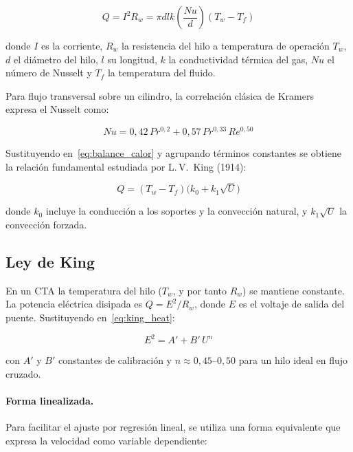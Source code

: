 \documentclass[12pt,a4paper]{article}
\begin{document}
\begin{equation}
	Q = I^2 R_w = \pi d l k \left(\frac{Nu}{d}\right)(T_w - T_f)
	\label{eq:balance_calor}
\end{equation}

donde $I$ es la corriente, $R_w$ la resistencia del hilo a temperatura de
operación $T_w$, $d$ el diámetro del hilo, $l$ su longitud, $k$ la
conductividad térmica del gas, $Nu$ el número de Nusselt y $T_f$ la
temperatura del fluido.

Para flujo transversal sobre un cilindro, la correlación clásica de
Kramers~\cite{bruun1995} expresa el Nusselt como:

\begin{equation}
	Nu = 0{,}42\,Pr^{0{,}2} + 0{,}57\,Pr^{0{,}33}\,Re^{0{,}50}
	\label{eq:kramers}
\end{equation}

Sustituyendo en~\eqref{eq:balance_calor} y agrupando términos constantes
se obtiene la relación fundamental estudiada por L.\,V.~King (1914):

\begin{equation}
	Q = (T_w - T_f)\bigl(k_0 + k_1\sqrt{U}\bigr)
	\label{eq:king_heat}
\end{equation}

donde $k_0$ incluye la conducción a los soportes y la convección natural, y
$k_1\sqrt{U}$ la convección forzada.

\subsection{Ley de King}
\label{subsec:king}

En un CTA la temperatura del hilo ($T_w$, y por tanto $R_w$) se mantiene
constante.  La potencia eléctrica disipada es $Q = E^2/R_w$, donde $E$ es
el voltaje de salida del puente.  Sustituyendo en~\eqref{eq:king_heat}:

\begin{equation}
	\boxed{E^2 = A' + B'\,U^n}
	\label{eq:king_clasica}
\end{equation}

con $A'$ y $B'$ constantes de calibración y $n \approx 0{,}45$--$0{,}50$
para un hilo ideal en flujo cruzado.

\paragraph{Forma linealizada.}  Para facilitar el ajuste por regresión
lineal, se utiliza una forma equivalente que expresa la velocidad como
variable dependiente:
\end{document}
